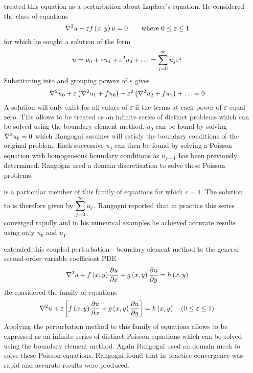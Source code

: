 \citet{rangogni:1986} treated 
this equation as a perturbation about Laplace's equation. He considered the class of equations
\begin{equation}
  \laplacian{}{u} + \varepsilon \fnof{f}{x,y} u = 0 \qquad 
    \text{where } 0 \leq \varepsilon \leq 1
\label{eq:eqnfamily}
\end{equation}
for which he sought a solution of the form
\begin{equation}
  u = u_{0} + \varepsilon u_{1} + \varepsilon^{2} u_{2} + \ldots =
   \displaystyle\sum_{j=0}^{\infty}  u_{j} \varepsilon^{j}
\label{eq:uexpan}
\end{equation}
Substituting  into  and grouping powers
 of $\varepsilon$ gives
\begin{equation}
  \laplacian{}{u_{0}} + \varepsilon \pbrac{\laplacian{}{u_{1}} + fu_{0}} +
  \varepsilon^{2} \pbrac{\laplacian{}{u_{2}} + fu_{1}} + \ldots = 0
\label{eq:groups}
\end{equation}
A solution will only exist for all values of $\varepsilon$ if the terms at
each power of $\varepsilon $ equal zero. This allows  to be
treated as an infinite series of distinct problems which can be solved
using the boundary element method. $u_{0}$ can be found by solving 
 $\laplacian{}{u_{0}} = 0$ which Rangogni assumes will satisfy the boundary 
conditions of the original problem.  Each successive $u_{j}$ can then be
found by solving a Poisson equation with homogeneous boundary conditions as 
 $u_{j-1}$ has been previously determined.  Rangogni used a domain
 discretisation to solve these Poisson problems.

 is a particular member of this family of equations for
which $\varepsilon =1$.  The solution to  is therefore
given by $ \displaystyle\sum_{j=0}^{\infty}  u_{j}$. Rangogni reported that in practice
this series converged rapidly and in his numerical examples he achieved
accurate results using only $u_{0}$ and $u_{1}$.

\citet{rangogni:1991} extended this coupled perturbation - boundary
element method to the general second-order variable coefficient PDE
\begin{equation}
  \laplacian{}{u} + \fnof{f}{x,y} \delby{u}{x} + \fnof{g}{x,y} \delby{u}{y} =
  \fnof{h}{x,y}
\end{equation}
He considered the family of equations
\begin{equation}
  \laplacian{}{u} + \varepsilon \sqbrac{\fnof{f}{x,y} \delby{u}{x} +
    \fnof{g}{x,y} \delby{u}{y}} = \fnof{h}{x,y} 
    \quad (0 \leq \varepsilon \leq 1)
\label{eq:family2}
\end{equation}
Applying the perturbation method to this family of equations allows
 to be expressed as an infinite series of distinct Poisson
equations which can be solved using the boundary element method. Again
Rangogni used an domain mesh to solve these Poisson equations.  Rangogni
found that in practice convergence was rapid and accurate results were
produced.

